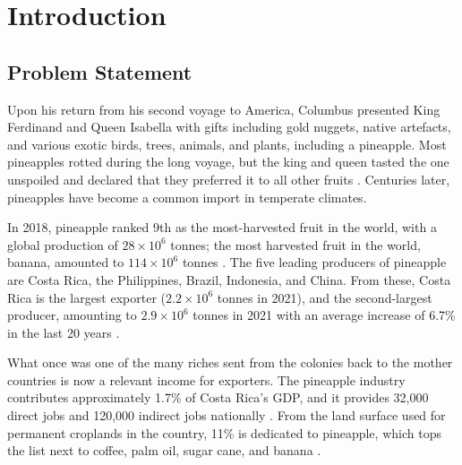 \chapter{Introduction}






\section{Problem Statement}

Upon his return from his second voyage to America, Columbus presented King Ferdinand and Queen Isabella with gifts including gold nuggets, native artefacts, and various exotic birds, trees, animals, and plants, including a pineapple. Most pineapples rotted during the long voyage, but the king and queen tasted the one unspoiled and declared that they preferred it to all other fruits \citep{o2013pineapple}. Centuries later, pineapples have become a common import in temperate climates. 

In 2018, pineapple ranked 9th as the most-harvested fruit in the world, with a global production of $28 \times 10^6$ tonnes; the most harvested fruit in the world, banana, amounted to $114 \times 10^6$ tonnes \citep{fruit2020international}. The five leading producers of pineapple are Costa Rica, the Philippines, Brazil, Indonesia, and China. From these, Costa Rica is the largest exporter ($2.2 \times 10^6$ tonnes in 2021), and the second-largest producer, amounting to $2.9 \times 10^6$ tonnes in 2021 with an average increase of 6.7\% in the last 20 years \citep{FAOSTAT2022}. 

What once was one of the many riches sent from the colonies back to the mother countries is now a relevant income for exporters. The pineapple industry contributes approximately 1.7\% of Costa Rica's GDP, and it provides 32,000 direct jobs and 120,000 indirect jobs nationally \citep{chen2020production, employmentCR}. From the land surface used for permanent croplands in the country, 11\% is dedicated to pineapple, which tops the list next to coffee, palm oil, sugar cane, and banana \citep{cenagro2014}. 

